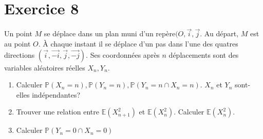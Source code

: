 \documentclass[11pt]{article}
\begin{document}
\section*{Exercice 8}

Un point $M$ se déplace dans un plan muni d'un repère$(O,\vec{i},\vec{j}$. Au départ, $M$ est au point $O$. À chaque instant il se déplace d'un pas dans l'une des quatres directions $(\vec{i},\vec{-i},\vec{j},\vec{-j})$. Ses coordonnées après $n$ déplacements sont des variables aléatoires réelles $X_n,Y_n$.

\begin{enumerate}
\item Calculer $\mathbb{P}(X_n=n),\mathbb{P}(Y_n=n),\mathbb{P}(Y_n=n\cap X_n=n)$. $X_n$ et $Y_n$ sont-elles indépendantes?
\item Trouver une relation entre $\mathbb{E}(X_{n+1}^2)$ et $\mathbb{E}(X_n^2)$. Calculer $\mathbb{E}(X_n^2)$.
\item Calculer $\mathbb{P}(Y_n=0\cap X_n=0)$
\end{enumerate}
\end{document}
